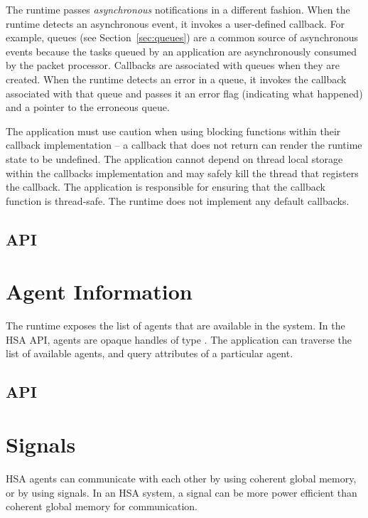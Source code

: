\documentclass[final]{book}
\begin{document}
The runtime passes \textit{asynchronous} notifications in a different
fashion. When the runtime detects an asynchronous event, it invokes a
user-defined callback. For example, queues (see Section~\ref{sec:queues}) are a
common source of asynchronous events because the tasks queued by an application
are asynchronously consumed by the packet processor. Callbacks are associated
with queues when they are created. When the runtime detects an error in a queue,
it invokes the callback associated with that queue and passes it an error flag
(indicating what happened) and a pointer to the erroneous queue.

The application must use caution when using blocking functions within their
callback implementation -- a callback that does not return can render the
runtime state to be undefined. The application cannot depend on thread local
storage within the callbacks implementation and may safely kill the thread that
registers the callback. The application is responsible for ensuring that
the callback function is thread-safe. The runtime does not implement any default
callbacks.

\subsection{API}


\section{Agent Information}
\label{sec:agentinfo}
The runtime exposes the list of agents that are available in the system. In the
HSA API, agents are opaque handles of type . The application
can traverse the list of available agents, and query attributes of a particular
agent.


\subsection{API}


\section{Signals}\label{sec:signals}

HSA agents can communicate with each other by using coherent global
memory, or by using signals. In an HSA system, a signal can be more power
efficient than coherent global memory for communication.
\end{document}
